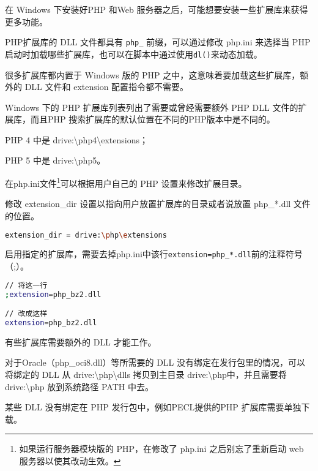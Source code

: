 在 Windows 下安装好PHP 和Web 服务器之后，可能想要安装一些扩展库来获得更多功能。

PHP扩展库的 DLL 文件都具有 \texttt{php\_} 前缀，可以通过修改 php.ini 来选择当 PHP 启动时加载哪些扩展库，也可以在脚本中通过使用\texttt{dl()}来动态加载。



很多扩展库都内置于 Windows 版的 PHP 之中，这意味着要加载这些扩展库，额外的 DLL 文件和 extension 配置指令都不需要。

Windows 下的 PHP 扩展库列表列出了需要或曾经需要额外 PHP DLL 文件的扩展库，而且PHP 搜索扩展库的默认位置在不同的PHP版本中是不同的。

\begin{compactitem}
\item PHP 4 中是 drive:{\textbackslash}php4{\textbackslash}extensions；
\item PHP 5 中是 drive:{\textbackslash}php5。
\end{compactitem}

在php.ini文件\footnote{如果运行服务器模块版的 PHP，在修改了 php.ini 之后别忘了重新启动 web 服务器以使其改动生效。}可以根据用户自己的 PHP 设置来修改扩展目录。 


\begin{compactitem}
\item 修改 extension\_dir 设置以指向用户放置扩展库的目录或者说放置 php\_*.dll 文件的位置。

\begin{lstlisting}[language=bash]
extension_dir = drive:\php\extensions
\end{lstlisting}

\item 启用指定的扩展库，需要去掉php.ini中该行\texttt{extension=php\_*.dll}前的注释符号（;）。

\begin{lstlisting}[language=bash]
// 将这一行
;extension=php_bz2.dll

// 改成这样
extension=php_bz2.dll
\end{lstlisting}

\item 有些扩展库需要额外的 DLL 才能工作。

对于Oracle（php\_oci8.dll）等所需要的 DLL 没有绑定在发行包里的情况，可以将绑定的 DLL 从 drive:{\textbackslash}php{\textbackslash}dlls 拷贝到主目录 drive:{\textbackslash}php中，并且需要将 drive:{\textbackslash}php 放到系统路径 PATH 中去。

\item 某些 DLL 没有绑定在 PHP 发行包中，例如PECL提供的PHP 扩展库需要单独下载。
\end{compactitem}

